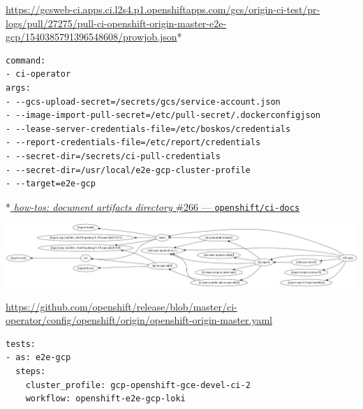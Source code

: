 \begin{frame}[fragile]
    \autotitle
    \tiny
    \url{https://gcsweb-ci.apps.ci.l2s4.p1.openshiftapps.com/gcs/origin-ci-test/pr-logs/pull/27275/pull-ci-openshift-origin-master-e2e-gcp/1540385791396548608/prowjob.json}*
    \footnotesize
    \begin{verbatim}
command:
- ci-operator
args:
- --gcs-upload-secret=/secrets/gcs/service-account.json
- --image-import-pull-secret=/etc/pull-secret/.dockerconfigjson
- --lease-server-credentials-file=/etc/boskos/credentials
- --report-credentials-file=/etc/report/credentials
- --secret-dir=/secrets/ci-pull-credentials
- --secret-dir=/usr/local/e2e-gcp-cluster-profile
- --target=e2e-gcp
    \end{verbatim}
    \vfill
    \small
    *\href{https://github.com/openshift/ci-docs/pull/266}{
        \textit{how-tos: document artifacts directory} \#266
        --- \texttt{openshift/ci-docs}
    }
\end{frame}

\begin{frame}
    \autotitle
    \includegraphics[width=\textwidth]{../ci-operator/img/graph_origin_gcp.jpg}
\end{frame}

\begin{frame}[fragile]
    \autotitle
    \footnotesize
    \url{https://github.com/openshift/release/blob/master/ci-operator/config/openshift/origin/openshift-origin-master.yaml}
    \vfill
    \normalsize
    \begin{verbatim}
tests:
- as: e2e-gcp
  steps:
    cluster_profile: gcp-openshift-gce-devel-ci-2
    workflow: openshift-e2e-gcp-loki
    \end{verbatim}
    \vfill
\end{frame}
